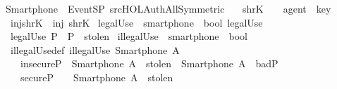 %
\begin{isabellebody}%
  \isadelimtheory
  \isanewline
  \isanewline
  \endisadelimtheory
  \isatagtheory
  \isamarkupfalse%
  \ Smartphone\ \ {\isachardoublequoteopen}{\isachardot}{\isacharslash}EventSP{\isachardoublequoteclose}\ {\isachardoublequoteopen}{\isachartilde}{\isachartilde}{\isacharslash}src{\isacharslash}HOL{\isacharslash}Auth{\isacharslash}All{\isacharunderscore}Symmetric{\isachardoublequoteclose}\ %
  \endisatagtheory
  {\isafoldtheory}%
  \isadelimtheory
  \isanewline
  \endisadelimtheory
  \isanewline
  \isanewline
  \isamarkupfalse%
  \isanewline
  \ \ shrK\ \ {\isacharcolon}{\isacharcolon}\ \ {\isachardoublequoteopen}agent\ {\isasymRightarrow}\ key{\isachardoublequoteclose}\isanewline
  \isanewline
  \isanewline
  \ \ inj{\isacharunderscore}shrK\ {\isacharcolon}\ {\isachardoublequoteopen}inj\ shrK{\isachardoublequoteclose}%
  \isadelimdocument
  \endisadelimdocument
  \isatagdocument
  \isamarkuptrue%
  \endisatagdocument
  {\isafolddocument}%
  \isadelimdocument
  \endisadelimdocument
  \isamarkupfalse%
  \ legalUse\ {\isacharcolon}{\isacharcolon}\ {\isachardoublequoteopen}smartphone\ {\isasymRightarrow}\ bool{\isachardoublequoteclose}\ {\isacharparenleft}{\isachardoublequoteopen}legalUse\ {\isacharparenleft}{\isacharunderscore}{\isacharparenright}{\isachardoublequoteclose}{\isacharparenright}\ \isanewline
  \ \ {\isachardoublequoteopen}legalUse\ P\ {\isacharequal}{\isacharequal}\ P\ {\isasymnotin}\ stolen{\isachardoublequoteclose}\isanewline
  \isanewline
  \isanewline
  \isamarkupfalse%
  \ illegalUse\ {\isacharcolon}{\isacharcolon}\ {\isachardoublequoteopen}smartphone\ {\isasymRightarrow}\ bool{\isachardoublequoteclose}\ \isanewline
  \ \ illegalUse{\isacharunderscore}def{\isacharcolon}\ {\isachardoublequoteopen}illegalUse\ {\isacharparenleft}Smartphone\ A{\isacharparenright}\ {\isacharequal}\ {\isacharparenleft}\isanewline
  \ \ \ \ {\isacharparenleft}insecureP\ {\isasymand}\ {\isacharparenleft}Smartphone\ A\ {\isasymin}\ stolen{\isacharparenright}\ {\isasymor}\ {\isacharparenleft}Smartphone\ A\ {\isasymin}\ badP{\isacharparenright}{\isacharparenright}\ {\isasymor}\isanewline
  \ \ \ \ {\isacharparenleft}secureP\ \ \ {\isasymand}\ {\isacharparenleft}Smartphone\ A\ {\isasymin}\ stolen{\isacharparenright}{\isacharparenright}{\isacharparenright}{\isachardoublequoteclose}%

\end{isabellebody}
